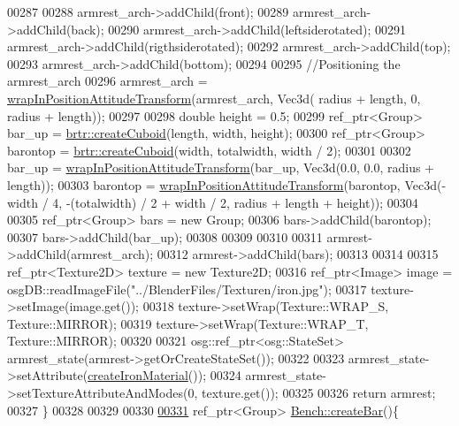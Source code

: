 \begin{DoxyCode}
00287 
00288         armrest\_arch->addChild(front);
00289         armrest\_arch->addChild(back);
00290         armrest\_arch->addChild(leftsiderotated);
00291         armrest\_arch->addChild(rigthsiderotated);
00292         armrest\_arch->addChild(top);
00293         armrest\_arch->addChild(bottom);
00294         
00295         \textcolor{comment}{//Positioning the armrest\_arch}
00296         armrest\_arch = \hyperlink{namespacebrtr_a887d7975f37c4334b70e2196735b6678}{wrapInPositionAttitudeTransform}(armrest\_arch, Vec3d(
      radius + length, 0, radius + length));
00297         
00298         \textcolor{keywordtype}{double} height = 0.5;
00299         ref\_ptr<Group> bar\_up = \hyperlink{namespacebrtr_ae7f155c263aec9663a02763ed0bb882b}{brtr::createCuboid}(length, width, height);
00300         ref\_ptr<Group> barontop = \hyperlink{namespacebrtr_ae7f155c263aec9663a02763ed0bb882b}{brtr::createCuboid}(width, totalwidth, width / 2);
00301         
00302         bar\_up = \hyperlink{namespacebrtr_a887d7975f37c4334b70e2196735b6678}{wrapInPositionAttitudeTransform}(bar\_up, Vec3d(0.0, 0.0, 
      radius + length));
00303         barontop = \hyperlink{namespacebrtr_a887d7975f37c4334b70e2196735b6678}{wrapInPositionAttitudeTransform}(barontop, Vec3d(-width / 
      4, -(totalwidth) / 2 + width / 2, radius + length + height));
00304 
00305         ref\_ptr<Group> bars = \textcolor{keyword}{new} Group;
00306         bars->addChild(barontop);
00307         bars->addChild(bar\_up);
00308 
00309 
00310 
00311         armrest->addChild(armrest\_arch);
00312         armrest->addChild(bars);
00313 
00314 
00315         ref\_ptr<Texture2D> texture = \textcolor{keyword}{new} Texture2D;
00316         ref\_ptr<Image> image = osgDB::readImageFile(\textcolor{stringliteral}{"../BlenderFiles/Texturen/iron.jpg"});
00317         texture->setImage(image.get());
00318         texture->setWrap(Texture::WRAP\_S, Texture::MIRROR);
00319         texture->setWrap(Texture::WRAP\_T, Texture::MIRROR);
00320 
00321         osg::ref\_ptr<osg::StateSet> armrest\_state(armrest->getOrCreateStateSet());
00322 
00323         armrest\_state->setAttribute(\hyperlink{classbrtr_1_1_bench_aafa199aa2218d57b290d99843a1443d4}{createIronMaterial}());
00324         armrest\_state->setTextureAttributeAndModes(0, texture.get());
00325 
00326         \textcolor{keywordflow}{return} armrest;
00327     \}
00328 
00329 
00330 
\hypertarget{_bench_8cpp_source_l00331}{}\hyperlink{classbrtr_1_1_bench_ae17e8e692f6c6deb7b722b5df58dc04b}{00331}     ref\_ptr<Group> \hyperlink{classbrtr_1_1_bench_ae17e8e692f6c6deb7b722b5df58dc04b}{Bench::createBar}()\{

\end{DoxyCode}
